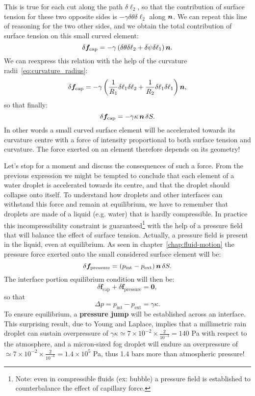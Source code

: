 This is true for each cut along the path $\delta \ell_2$, so that the contribution of surface tension for these two opposite sides is $ -\gamma \delta \theta \delta \ell_2$ along $\bn$. We can repeat this line of reasoning for the two other sides, and we obtain the total contribution of surface tension on this small curved element:
\begin{equation}
\delta \boldsymbol f_\text{cap} = - \gamma \lp \delta \theta \delta \ell_2 + \delta \psi \delta \ell_1 \rp \bn.
\end{equation}
We can reexpress this relation with the help of the curvature radii~\eqref{eq:curvature_radius}:
\begin{equation}
\delta \boldsymbol f_\text{cap} = - \gamma \lp \frac{1}{R_1}\delta \ell_1 \delta \ell_2 + \frac{1}{R_2}\delta \ell_1 \delta \ell_1 \rp \bn,
\end{equation}
so that finally:
\begin{equation}
\delta \boldsymbol f_\text{cap} = - \gamma \kappa \, \bn \, \delta S.
\end{equation}
In other words a small curved surface element will be accelerated towards its curvature centre with a force of intensity proportional to both surface tension and curvature. The force exerted on an element therefore depends on its geometry!

Let's stop for a moment and discuss the consequences of such a force. From the previous expression we might be tempted to conclude that each element of a water droplet is accelerated towards its centre, and that the droplet should collapse onto itself. To understand how droplets and other interfaces can withstand this force and remain at equilibrium, we have to remember that droplets are made of a liquid (e.g. water) that is hardly compressible. In practice this incompressibility constraint is guaranteed\footnote{Note: even in compressible fluids (ex: bubble) a pressure field is established to counterbalance the effect of capillary force.} with the help of a pressure field that will balance the effect of surface tension. Actually, a pressure field is present in the liquid, even at equilibrium. As seen in chapter~\ref{chap:fluid-motion} the pressure force exerted onto the small considered surface element will be: 
$$
\delta \boldsymbol f_\text{pressure} = \lp p_\text{int} - p_\text{ext}\rp \bn \,\delta S.
$$
The interface portion equilibrium condition will then be:
\begin{equation}
\delta \boldsymbol f_\text{cap} + \delta \boldsymbol f_\text{pressure}  = \boldsymbol 0,
\end{equation}
so that
\begin{equation}
\Delta p = p_\text{int} - p_\text{ext} = \gamma \kappa.
\label{eq:laplace_jump}
\end{equation}
To ensure equilibrium, a \textbf{pressure jump} will be established across an interface. This surprising result, due to Young and Laplace, implies that a millimetric rain droplet can sustain overpressure of $\gamma \kappa \simeq 7 \times 10^{-2} \times \frac{2}{10^{-3}} = 140 $ Pa with respect to the atmosphere, and a micron-sized fog droplet will endure an overpressure of $\simeq 7 \times 10^{-2} \times \frac{2}{10^{-6}} = 1.4\times 10^{5} $ Pa, thus 1.4 bars more than atmospheric pressure!
